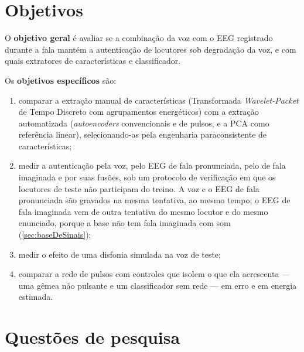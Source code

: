 	\section{Objetivos}

		\par O \textbf{objetivo geral} é avaliar se a combinação da voz com o \ac{EEG} registrado durante a fala mantém a autenticação de locutores sob degradação da voz, e com quais extratores de características e classificador.

		\par Os \textbf{objetivos específicos} são:
		\begin{enumerate}
			\item comparar a extração manual de características (Transformada \textit{Wavelet-Packet} de Tempo Discreto com agrupamentos energéticos) com a extração automatizada (\textit{autoencoders} convencionais e de pulsos, e a \ac{PCA} como referência linear), selecionando-as pela engenharia paraconsistente de características;
			\item medir a autenticação pela voz, pelo \ac{EEG} de fala pronunciada, pelo de fala imaginada e por suas fusões, sob um protocolo de verificação em que os locutores de teste não participam do treino. A voz e o \ac{EEG} de fala pronunciada são gravados na mesma tentativa, ao mesmo tempo; o \ac{EEG} de fala imaginada vem de outra tentativa do mesmo locutor e do mesmo enunciado, porque a base não tem fala imaginada com som (\autoref{sec:baseDeSinais});
			\item medir o efeito de uma disfonia simulada na voz de teste;
			\item comparar a rede de pulsos com controles que isolem o que ela acrescenta --- uma gêmea não pulsante e um classificador sem rede --- em erro e em energia estimada.
		\end{enumerate}

	\section{Questões de pesquisa}


